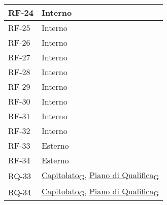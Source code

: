 \begin{longtable}{|>{\centering\arraybackslash}m{}|>{\centering\arraybackslash}m{}|}
	RF-24           & Interno                                                                                                           \\\hline
	RF-25           & Interno                                                                                                           \\\hline
	RF-26           & Interno                                                                                                           \\\hline
	RF-27           & Interno                                                                                                           \\\hline
	RF-28           & Interno                                                                                                           \\\hline
	RF-29           & Interno                                                                                                           \\\hline
	RF-30           & Interno                                                                                                           \\\hline
	RF-31           & Interno                                                                                                           \\\hline
	RF-32           & Interno                                                                                                           \\\hline
	RF-33           & Esterno                                                                                                           \\\hline
	RF-34           & Esterno                                                                                                           \\\hline
	RQ-33           & \href{https://7last.github.io/docs/rtb/documentazione-interna/glossario\#capitolato}{Capitolato\textsubscript{G}}, \href{https://7last.github.io/docs/rtb/documentazione-interna/glossario\#piano-di-qualifica}{Piano di Qualifica\textsubscript{G}} \\\hline
	RQ-34           & \href{https://7last.github.io/docs/rtb/documentazione-interna/glossario\#capitolato}{Capitolato\textsubscript{G}}, \href{https://7last.github.io/docs/rtb/documentazione-interna/glossario\#piano-di-qualifica}{Piano di Qualifica\textsubscript{G}} \\\hline

\end{longtable}
